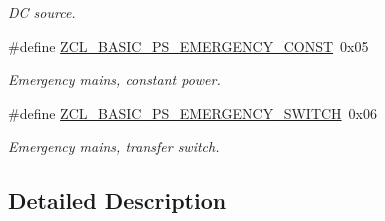 \begin{DoxyCompactItemize}
\begin{DoxyCompactList}\small\item\em D\-C source. \end{DoxyCompactList}\item 
\hypertarget{group__zcl__basic_gacdadf5dfcbe4d7435e1f718c9ce9d275}{\#define \hyperlink{group__zcl__basic_gacdadf5dfcbe4d7435e1f718c9ce9d275}{Z\-C\-L\-\_\-\-B\-A\-S\-I\-C\-\_\-\-P\-S\-\_\-\-E\-M\-E\-R\-G\-E\-N\-C\-Y\-\_\-\-C\-O\-N\-S\-T}~0x05}\label{group__zcl__basic_gacdadf5dfcbe4d7435e1f718c9ce9d275}

\begin{DoxyCompactList}\small\item\em Emergency mains, constant power. \end{DoxyCompactList}\item 
\hypertarget{group__zcl__basic_ga6a1e540c72d5ec1df8acc904c83f4bc9}{\#define \hyperlink{group__zcl__basic_ga6a1e540c72d5ec1df8acc904c83f4bc9}{Z\-C\-L\-\_\-\-B\-A\-S\-I\-C\-\_\-\-P\-S\-\_\-\-E\-M\-E\-R\-G\-E\-N\-C\-Y\-\_\-\-S\-W\-I\-T\-C\-H}~0x06}\label{group__zcl__basic_ga6a1e540c72d5ec1df8acc904c83f4bc9}

\begin{DoxyCompactList}\small\item\em Emergency mains, transfer switch. \end{DoxyCompactList}\end{DoxyCompactItemize}


\subsection{Detailed Description}


